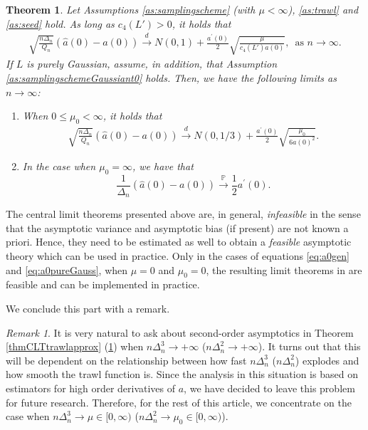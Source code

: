 \documentclass{article}
\theoremstyle{plain}
\newtheorem{theorem}{Theorem}
\theoremstyle{definition}
\theoremstyle{remark}
\newtheorem{remark}{Remark}[section]
\begin{document}
\begin{theorem}\label{thmCLTt0Gaussian} Let Assumptions \ref{as:samplingscheme} (with $\mu<\infty$),
	\ref{as:trawl} and \ref{as:seed} hold. As long as $c_{4}(L')>0$,
	it holds that
	\begin{align}\label{eq:a0gen}
		\sqrt{\frac{n\Delta_{n}}{Q_{n}}}\left(\hat{a}(0)-a(0)\right)\overset{d}{\rightarrow}N(0,1)+\frac{a^{\prime}(0)}{2}\sqrt{\frac{\mu}{c_{4}(L')a(0)}},\,\,\,\text{as }n\rightarrow\infty.
	\end{align}
	If $L$ is purely Gaussian, assume, in addition, that Assumption \ref{as:samplingschemeGaussiant0}
	holds. Then, we have the following limits as $n\rightarrow\infty$:
	\begin{enumerate}
		\item When $0\leq\mu_{0}<\infty$, it holds that 
		\begin{align}\label{eq:a0pureGauss}
			\sqrt{\frac{n\Delta_{n}}{Q_{n}}}\left(\hat{a}(0)-a(0)\right)\overset{d}{\rightarrow}N(0,1/3)+\frac{a^{\prime}(0)}{2}\sqrt{\frac{\mu_{0}}{6a(0)^{2}}}.
		\end{align}
		\item In the case when $\mu_{0}=\infty$, we have that 
		\[
		\frac{1}{\Delta_{n}}\left(\hat{a}(0)-a(0)\right)\overset{\mathbb{P}}{\rightarrow}\frac{1}{2}a^{\prime}(0).
		\]
	\end{enumerate}	
\end{theorem}


The central limit theorems presented above are, in general,  \emph{infeasible} in the sense that the asymptotic variance and asymptotic bias (if present) are not known a priori.
Hence, they need to be estimated as well to obtain a \emph{feasible} asymptotic theory which can be used in practice. 
Only in the cases of equations \eqref{eq:a0gen} and \eqref{eq:a0pureGauss}, when $\mu=0$ and $\mu_0=0$, the resulting limit theorems in  are feasible and can be implemented in practice.


We conclude this part with a remark.
\begin{remark}  It is very natural to ask about second-order asymptotics in Theorem \ref{thmCLTtrawlapprox} (\ref{thmCLTt0Gaussian}) when $n\Delta_{n}^3\rightarrow+\infty$ ($n\Delta_{n}^2\rightarrow+\infty$). It turns out that this will be dependent on the relationship between how fast $n\Delta_{n}^3$ ($n\Delta_{n}^2$) explodes and how smooth the trawl function is. Since the analysis in this situation is based on estimators for high order derivatives of $a$, we have decided to leave this problem for future research. Therefore, for the rest of this article, we concentrate on the case when $n\Delta_{n}^3\rightarrow\mu\in[0,\infty)$ ($n\Delta_{n}^2\rightarrow\mu_0\in[0,\infty)$).
\end{remark} 
\end{document}
